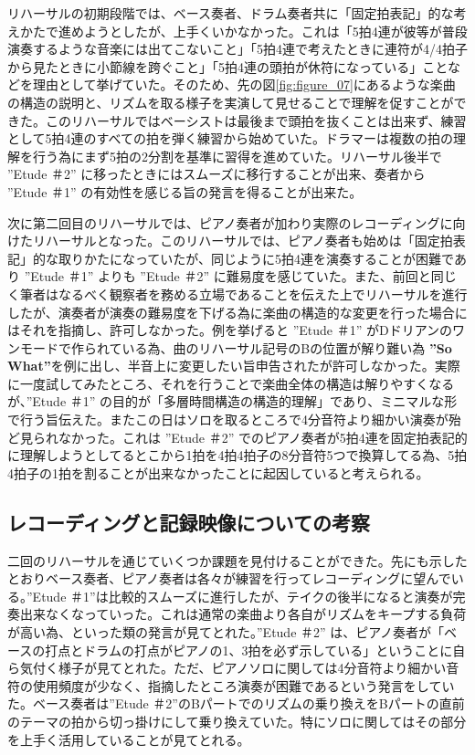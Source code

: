 \documentclass[uplatex,dvipdfmx]{ujarticle}
\begin{document}
リハーサルの初期段階では、ベース奏者、ドラム奏者共に「固定拍表記」的な考えかたで進めようとしたが、上手くいかなかった。これは「5拍4連が彼等が普段演奏するような音楽には出てこないこと」「5拍4連で考えたときに連符が4/4拍子から見たときに小節線を跨ぐこと」「5拍4連の頭拍が休符になっている」ことなどを理由として挙げていた。そのため、先の図\ref{fig:figure_07}にあるような楽曲の構造の説明と、リズムを取る様子を実演して見せることで理解を促すことができた。このリハーサルではベーシストは最後まで頭拍を抜くことは出来ず、練習として5拍4連のすべての拍を弾く練習から始めていた。ドラマーは複数の拍の理解を行う為にまず5拍の2分割を基準に習得を進めていた。リハーサル後半で ''Etude ＃2'' に移ったときにはスムーズに移行することが出来、奏者から ''Etude ＃1'' の有効性を感じる旨の発言を得ることが出来た。

次に第二回目のリハーサルでは、ピアノ奏者が加わり実際のレコーディングに向けたリハーサルとなった。このリハーサルでは、ピアノ奏者も始めは「固定拍表記」的な取りかたになっていたが、同じように5拍4連を演奏することが困難であり ''Etude ＃1'' よりも ''Etude ＃2'' に難易度を感じていた。また、前回と同じく筆者はなるべく観察者を務める立場であることを伝えた上でリハーサルを進行したが、演奏者が演奏の難易度を下げる為に楽曲の構造的な変更を行った場合にはそれを指摘し、許可しなかった。例を挙げると ''Etude ＃1'' がDドリアンのワンモードで作られている為、曲のリハーサル記号のBの位置が解り難い為 {\bf ''So What''}\cite{miles:01}を例に出し、半音上に変更したい旨申告されたが許可しなかった。実際に一度試してみたところ、それを行うことで楽曲全体の構造は解りやすくなるが、''Etude ＃1'' の目的が「多層時間構造の構造的理解」であり、ミニマルな形で行う旨伝えた。またこの日はソロを取るところで4分音符より細かい演奏が殆ど見られなかった。これは ''Etude ＃2'' でのピアノ奏者が5拍4連を固定拍表記的に理解しようとしてるとこから1拍を4拍4拍子の8分音符5つで換算してる為、5拍4拍子の1拍を割ることが出来なかったことに起因していると考えられる。

\subsection{レコーディングと記録映像についての考察}

二回のリハーサルを通じていくつか課題を見付けることができた。先にも示したとおりベース奏者、ピアノ奏者は各々が練習を行ってレコーディングに望んでいる。''Etude ＃1''は比較的スムーズに進行したが、テイクの後半になると演奏が完奏出来なくなっていった。これは通常の楽曲より各自がリズムをキープする負荷が高い為、といった類の発言が見てとれた。''Etude ＃2'' は、ピアノ奏者が「ベースの打点とドラムの打点がピアノの1、3拍を必ず示している」ということに自ら気付く様子が見てとれた。ただ、ピアノソロに関しては4分音符より細かい音符の使用頻度が少なく、指摘したところ演奏が困難であるという発言をしていた。ベース奏者は''Etude ＃2''のBパートでのリズムの乗り換えをBパートの直前のテーマの拍から切っ掛けにして乗り換えていた。特にソロに関してはその部分を上手く活用していることが見てとれる。
\end{document}

